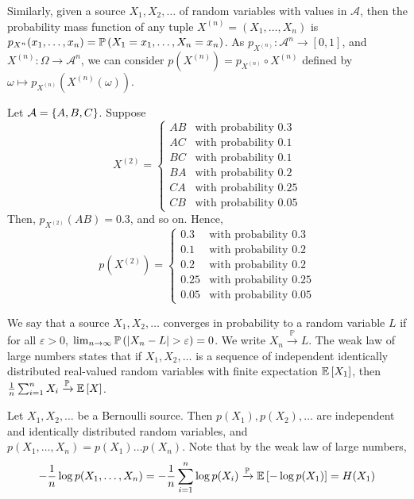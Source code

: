 Similarly, given a source \( X_1, X_2, \dots \) of random variables with values in \( \mathcal A \), then the probability mass function of any tuple \( X^{(n)} = (X_1, \dots, X_n) \) is \( p_{X^{n}}(x_1, \dots, x_n) = \mathbb{P}\left({X_1 = x_1, \dots, X_n = x_n}\right) \).
As \( p_{X^{(n)}} \colon \mathcal A^n \to [0,1] \), and \( X^{(n)} \colon \Omega \to \mathcal A^n \), we can consider \( p(X^{(n)}) = p_{X^{(n)}} \circ X^{(n)} \) defined by \( \omega \mapsto p_{X^{(n)}}(X^{(n)}(\omega)) \).
\begin{example}
    Let \( \mathcal A = \qty{A, B, C} \).
    Suppose
    \[ X^{(2)} = \begin{cases}
        AB & \text{with probability } 0.3 \\
        AC & \text{with probability } 0.1 \\
        BC & \text{with probability } 0.1 \\
        BA & \text{with probability } 0.2 \\
        CA & \text{with probability } 0.25 \\
        CB & \text{with probability } 0.05
    \end{cases} \]
    Then, \( p_{X^{(2)}}(AB) = 0.3 \), and so on.
    Hence,
    \[ p(X^{(2)}) = \begin{cases}
        0.3 & \text{with probability } 0.3 \\
        0.1 & \text{with probability } 0.2 \\
        0.2 & \text{with probability } 0.2 \\
        0.25 & \text{with probability } 0.25 \\
        0.05 & \text{with probability } 0.05
    \end{cases} \]
\end{example}
We say that a source \( X_1,X_2, \dots \) converges in probability to a random variable \( L \) if for all \( \varepsilon > 0 \), \( \lim_{n \to \infty} \mathbb{P}\left({\abs{X_n - L} > \varepsilon}\right) = 0 \).
We write \( X_n \xrightarrow{\mathbb P} L \).
The weak law of large numbers states that if \( X_1, X_2, \dots \) is a sequence of independent identically distributed real-valued random variables with finite expectation \( \mathbb{E}\left[{X_1}\right] \), then \( \frac{1}{n} \sum_{i=1}^n X_i \xrightarrow{\mathbb P} \mathbb{E}\left[{X}\right] \).
\begin{example}
    Let \( X_1, X_2, \dots \) be a Bernoulli source.
    Then \( p(X_1), p(X_2), \dots \) are independent and identically distributed random variables, and \( p(X_1, \dots, X_n) = p(X_1) \dots p(X_n) \).
    Note that by the weak law of large numbers,
    \[ -\frac{1}{n} \log p(X_1, \dots, X_n) = -\frac{1}{n} \sum_{i=1}^n \log p(X_i) \xrightarrow{\mathbb P} \mathbb{E}\left[{-\log p(X_1)}\right] = H(X_1) \]
\end{example}
